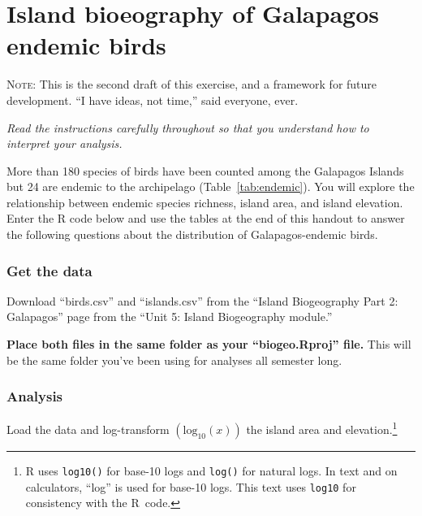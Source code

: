 \documentclass[11pt]{article}
\newcommand*{\assignmentTitle}{Island bioeography of Galapagos endemic birds}
\begin{document}
\thispagestyle{first_page}

\section*{\assignmentTitle}

\textsc{Note:} This is the second draft of this exercise, and a framework for future development. “I have ideas, not time,” said everyone, ever. 

\textit{Read the instructions carefully throughout so that you understand how to interpret your analysis.}

More than 180 species of birds have been counted among the Galapagos Islands but 24 are endemic to the archipelago (Table~\ref{tab:endemic}). You will explore the relationship between endemic species richness, island area, and island elevation. Enter the R code below and use the tables at the end of this handout to answer the following questions about the distribution of Galapagos-endemic birds.  

\subsubsection*{Get the data}

Download “birds.csv” and “islands.csv” from the “Island Biogeography Part 2: Galapagos” page from the “Unit 5: Island Biogeography module.”

\textbf{Place both files in the same folder as your “biogeo.Rproj” file.} This will be the same folder you've been using for analyses all semester long.

\subsubsection*{Analysis}

Load the data and log-transform $\left(\mathrm{log}_{10}(x)\right)$ the island area and elevation.\footnote{R uses \texttt{log10()} for base-10 logs and \texttt{log()} for natural logs. In text and on calculators, “log” is used for base-10 logs. This text uses \texttt{log10} for consistency with the R~code.} 
\end{document}
